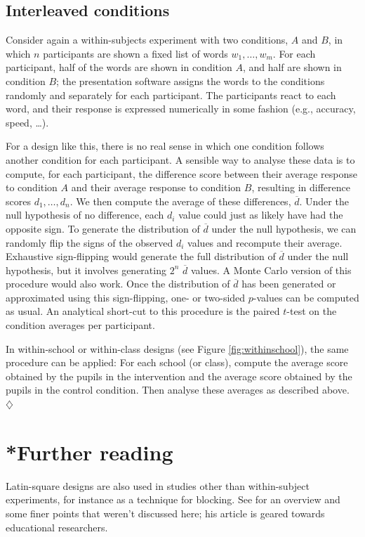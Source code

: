 \documentclass[a4paper]{tufte-book}\usepackage[]{graphicx}\usepackage[]{xcolor}
\newcommand*{\parend}[1][$\diamondsuit$]{%
\leavevmode\unskip\penalty9999 \hbox{}\nobreak\hfill
    \quad\hbox{#1}%
}
\begin{document}
\subsection{Interleaved conditions}
Consider again a within-subjects experiment with two conditions, $A$ and $B$,
in which $n$ participants are shown a fixed list of words $w_1, \dots, w_m$.
For each participant, half of the words are shown in condition $A$,
and half are shown in condition $B$;
the presentation software assigns the words to the conditions randomly
and separately for each participant.
The participants react to each word, and their response is expressed numerically
in some fashion (e.g., accuracy, speed, \dots).

For a design like this, there is no real sense in which one condition
follows another condition for each participant.
A sensible way to analyse these data is to compute, for each participant,
the difference score between their average response to condition $A$
and their average response to condition $B$, resulting in difference
scores $d_1, \dots, d_n$.
We then compute the average of these differences, $\overline d$.
Under the null hypothesis of no difference,
each $d_i$ value could just as likely have had the opposite sign.
To generate the distribution of $\overline d$ under the null hypothesis,
we can randomly flip the signs of the observed $d_i$ values
and recompute their average.
Exhaustive sign-flipping would generate the full distribution of $\overline d$
under the null hypothesis, but it involves generating $2^n$ $\overline d$ values.
A Monte Carlo version of this procedure would also work.
Once the distribution of $\overline d$ has been generated or approximated using this sign-flipping,
one- or two-sided $p$-values can be computed as usual.
An analytical short-cut to this procedure is the paired $t$-test on the condition averages per participant.
  
  In within-school or within-class designs (see Figure \vref{fig:withinschool}),
  the same procedure can be applied: For each school (or class), compute
  the average score obtained by the pupils in the intervention and the average
  score obtained by the pupils in the control condition.
  Then analyse these averages as described above.
\parend

\section{*Further reading}
Latin-square designs are also used in studies other than 
within-subject experiments, for instance as a technique for blocking.
See \citet{Richardson2018} for an overview and some finer points that weren't discussed here; 
his article is geared towards educational researchers.
\end{document}
